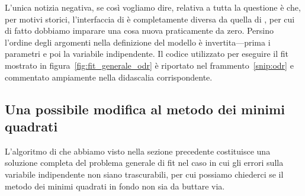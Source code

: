 
L'unica notizia negativa, se così vogliamo dire, relativa a tutta la
questione è che, per motivi storici, l'interfaccia di 
è completamente diversa da quella di , per
cui di fatto dobbiamo imparare una cosa nuova praticamente da zero. Persino
l'ordine degli argomenti nella definizione del modello è invertita---prima
i parametri e poi la variabile indipendente. Il codice utilizzato per eseguire
il fit mostrato in figura~\ref{fig:fit_generale_odr} è riportato nel
frammento~\ref{snip:odr} e commentato ampiamente nella didascalia
corrispondente.



\subsection{Una possibile modifica al metodo dei minimi quadrati}
\label{sec:fit_errori_efficaci}

L'algoritmo di  che abbiamo visto nella
sezione precedente costituisce una soluzione completa del problema generale
di fit nel caso in cui gli errori sulla variabile indipendente
non siano trascurabili, per cui possiamo chiederci se il metodo dei minimi
quadrati in fondo non sia da buttare via.

